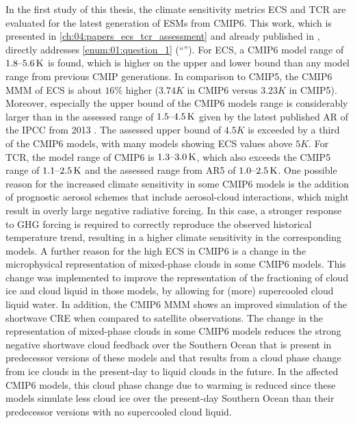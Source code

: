 In the first study of this thesis, the climate sensitivity metrics \ac{ECS} and
\ac{TCR} are evaluated for the latest generation of \acp{ESM} from \acs{CMIP}6.
This work, which is presented in \cref{ch:04:papers_ecs_tcr_assessment} and
already published in \textcite{Bock2020, Meehl2020}, directly addresses
\cref{enum:01:question_1} (\enquote{\KeyScienceQuestionOne{}}). For \ac{ECS}, a
\acs{CMIP}6 model range of $\rangeunit{1.8}{5.6}{K}$ is found, which is higher
on the upper and lower bound than any model range from previous \ac{CMIP}
generations. In comparison to \acs{CMIP}5, the \acs{CMIP}6 \ac{MMM} of \ac{ECS}
is about $16 \unit{\%}$ higher ($3.74 \unit{K}$ in \acs{CMIP}6 versus $3.23
\unit{K}$ in \acs{CMIP}5). Moreover, especially the upper bound of the
\acs{CMIP}6 models range is considerably larger than in the assessed range of
$\rangeunit{1.5}{4.5}{K}$ given by the latest published \ac{AR} of the
\ac{IPCC} from 2013 \autocite{Stocker2013}. The assessed upper bound of $4.5
\unit{K}$ is exceeded by a third of the \acs{CMIP}6 models, with many models
showing \ac{ECS} values above $5 \unit{K}$. For \ac{TCR}, the model range of
\acs{CMIP}6 is $\rangeunit{1.3}{3.0}{K}$, which also exceeds the \acs{CMIP}5
range of $\rangeunit{1.1}{2.5}{K}$ and the assessed range from \acs{AR}5 of
$\rangeunit{1.0}{2.5}{K}$. One possible reason for the increased climate
sensitivity in some \acs{CMIP}6 models is the addition of prognostic aerosol
schemes that include aerosol-cloud interactions, which might result in overly
large negative radiative forcing. In this case, a stronger response to \ac{GHG}
forcing is required to correctly reproduce the observed historical temperature
trend, resulting in a higher climate sensitivity in the corresponding models. A
further reason for the high \ac{ECS} in \acs{CMIP}6 is a change in the
microphysical representation of mixed-phase clouds in some \acs{CMIP}6 models.
This change was implemented to improve the representation of the fractioning of
cloud ice and cloud liquid in those models, \eg{} by allowing for (more)
supercooled cloud liquid water. In addition, the \acs{CMIP}6 \ac{MMM} shows an
improved simulation of the shortwave \ac{CRE} when compared to satellite
observations. The change in the representation of mixed-phase clouds in some
\acs{CMIP}6 models reduces the strong negative shortwave cloud feedback over
the Southern Ocean that is present in predecessor versions of these models and
that results from a cloud phase change from ice clouds in the present-day to
liquid clouds in the future. In the affected \acs{CMIP}6 models, this cloud
phase change due to warming is reduced since these models simulate less cloud
ice over the present-day Southern Ocean than their predecessor versions with no
supercooled cloud liquid.

